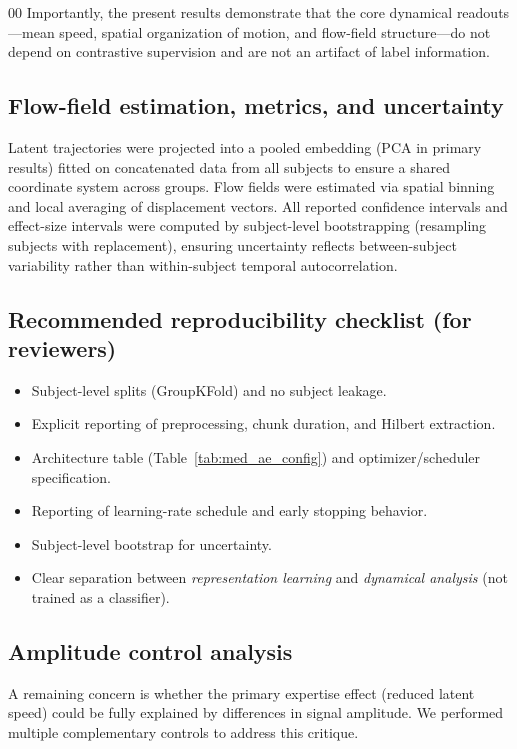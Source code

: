 \documentclass[5p,twocolumn,authoryear]{elsarticle}
\newcommand{\tabref}[1]{Table~\ref{#1}}
\begin{document}
\begin{thebibliography}{00}
Importantly, the present results demonstrate that the core dynamical readouts—mean speed, spatial organization of motion, and flow-field structure—do not depend on contrastive supervision and are not an artifact of label information.
\subsection{Flow-field estimation, metrics, and uncertainty}
\label{app:flow_metrics}
Latent trajectories were projected into a pooled embedding (PCA in primary results) fitted on concatenated data from all subjects to ensure a shared coordinate system across groups. Flow fields were estimated via spatial binning and local averaging of displacement vectors. All reported confidence intervals and effect-size intervals were computed by subject-level bootstrapping (resampling subjects with replacement), ensuring uncertainty reflects between-subject variability rather than within-subject temporal autocorrelation.

\subsection{Recommended reproducibility checklist (for reviewers)}
\begin{itemize}
    \item Subject-level splits (GroupKFold) and no subject leakage.
    \item Explicit reporting of preprocessing, chunk duration, and Hilbert extraction.
    \item Architecture table (\tabref{tab:med_ae_config}) and optimizer/scheduler specification.
    \item Reporting of learning-rate schedule and early stopping behavior.
    \item Subject-level bootstrap for uncertainty.
    \item Clear separation between \emph{representation learning} and \emph{dynamical analysis} (not trained as a classifier).
\end{itemize}

\subsection{Amplitude control analysis}
\label{app:amplitude_control}

A remaining concern is whether the primary expertise effect (reduced latent speed) could be fully explained by differences in signal amplitude. We performed multiple complementary controls to address this critique.


\end{thebibliography}
\end{document}
